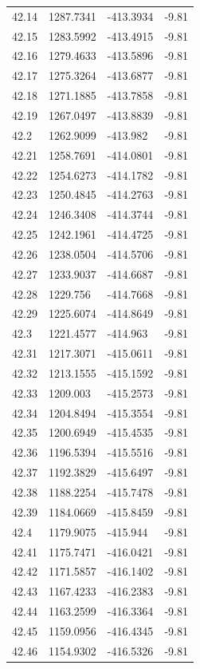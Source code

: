 \begin{table}[H]
\begin{tabular}{llll}
42.14 & 1287.7341 & -413.3934 & -9.81 \\
42.15 & 1283.5992 & -413.4915 & -9.81 \\
42.16 & 1279.4633 & -413.5896 & -9.81 \\
42.17 & 1275.3264 & -413.6877 & -9.81 \\
42.18 & 1271.1885 & -413.7858 & -9.81 \\
42.19 & 1267.0497 & -413.8839 & -9.81 \\
42.2 & 1262.9099 & -413.982 & -9.81 \\
42.21 & 1258.7691 & -414.0801 & -9.81 \\
42.22 & 1254.6273 & -414.1782 & -9.81 \\
42.23 & 1250.4845 & -414.2763 & -9.81 \\
42.24 & 1246.3408 & -414.3744 & -9.81 \\
42.25 & 1242.1961 & -414.4725 & -9.81 \\
42.26 & 1238.0504 & -414.5706 & -9.81 \\
42.27 & 1233.9037 & -414.6687 & -9.81 \\
42.28 & 1229.756 & -414.7668 & -9.81 \\
42.29 & 1225.6074 & -414.8649 & -9.81 \\
42.3 & 1221.4577 & -414.963 & -9.81 \\
42.31 & 1217.3071 & -415.0611 & -9.81 \\
42.32 & 1213.1555 & -415.1592 & -9.81 \\
42.33 & 1209.003 & -415.2573 & -9.81 \\
42.34 & 1204.8494 & -415.3554 & -9.81 \\
42.35 & 1200.6949 & -415.4535 & -9.81 \\
42.36 & 1196.5394 & -415.5516 & -9.81 \\
42.37 & 1192.3829 & -415.6497 & -9.81 \\
42.38 & 1188.2254 & -415.7478 & -9.81 \\
42.39 & 1184.0669 & -415.8459 & -9.81 \\
42.4 & 1179.9075 & -415.944 & -9.81 \\
42.41 & 1175.7471 & -416.0421 & -9.81 \\
42.42 & 1171.5857 & -416.1402 & -9.81 \\
42.43 & 1167.4233 & -416.2383 & -9.81 \\
42.44 & 1163.2599 & -416.3364 & -9.81 \\
42.45 & 1159.0956 & -416.4345 & -9.81 \\
42.46 & 1154.9302 & -416.5326 & -9.81 \\

\end{tabular}
\end{table}

